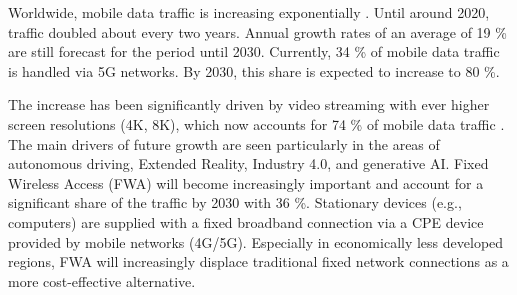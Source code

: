 \begin{English}
    Worldwide, mobile data traffic is increasing exponentially \cite{EricssonMobilityReport}. Until around 2020, traffic doubled about every two years. Annual growth rates of an average of 19 \% are still forecast for the period until 2030. Currently, 34 \% of mobile data traffic is handled via 5G networks. By 2030, this share is expected to increase to 80 \%.

    The increase has been significantly driven by video streaming with ever higher screen resolutions (4K, 8K), which now accounts for 74 \% of mobile data traffic \cite{EricssonMobilityReport}. The main drivers of future growth are seen particularly in the areas of autonomous driving, Extended Reality, Industry 4.0, and generative AI. 
    Fixed Wireless Access (FWA) will become increasingly important and account for a significant share of the traffic by 2030 with 36 \%. Stationary devices (e.g., computers) are supplied with a fixed broadband connection via a CPE device provided by mobile networks (4G/5G). Especially in economically less developed regions, FWA will increasingly displace traditional fixed network connections as a more cost-effective alternative.
\end{English}

